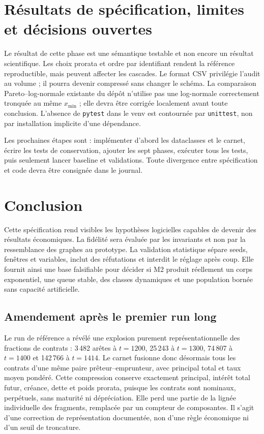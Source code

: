 \documentclass[11pt,a4paper]{article}
\newcommand{\code}[1]{\texttt{#1}}
\begin{document}
\section{Résultats de spécification, limites et décisions ouvertes}

Le résultat de cette phase est une sémantique testable et non encore un résultat
scientifique. Les choix prorata et ordre par identifiant rendent la référence
reproductible, mais peuvent affecter les cascades. Le format CSV privilégie
l'audit au volume ; il pourra devenir compressé sans changer le schéma. La
comparaison Pareto--log-normale existante du dépôt n'utilise pas une log-normale
correctement tronquée au même $x_{\min}$ ; elle devra être corrigée localement
avant toute conclusion. L'absence de \code{pytest} dans le venv est contournée
par \code{unittest}, non par installation implicite d'une dépendance.

Les prochaines étapes sont : implémenter d'abord les dataclasses et le carnet,
écrire les tests de conservation, ajouter les sept phases, exécuter tous les
tests, puis seulement lancer baseline et validations. Toute divergence entre
spécification et code devra être consignée dans le journal.

\section{Conclusion}

Cette spécification rend visibles les hypothèses logicielles capables de devenir
des résultats économiques. La fidélité sera évaluée par les invariants et non par
la ressemblance des graphes au prototype. La validation statistique sépare seeds,
fenêtres et variables, inclut des réfutations et interdit le réglage après coup.
Elle fournit ainsi une base falsifiable pour décider si M2 produit réellement un
corps exponentiel, une queue stable, des classes dynamiques et une population
bornée sans capacité artificielle.

\subsection*{Amendement après le premier run long}

Le run de référence a révélé une explosion purement représentationnelle des
fractions de contrats : 3\,482 arêtes à $t=1200$, 25\,243 à $t=1300$, 74\,807 à
$t=1400$ et 142\,766 à $t=1414$. Le carnet fusionne donc désormais tous les
contrats d'une même paire prêteur--emprunteur, avec principal total et taux moyen
pondéré. Cette compression conserve exactement principal, intérêt total futur,
créance, dette et poids prorata, puisque les contrats sont nominaux, perpétuels,
sans maturité ni dépréciation. Elle perd une partie de la lignée individuelle des
fragments, remplacée par un compteur de composantes. Il s'agit d'une correction
de représentation documentée, non d'une règle économique ni d'un seuil de
troncature.
\end{document}
